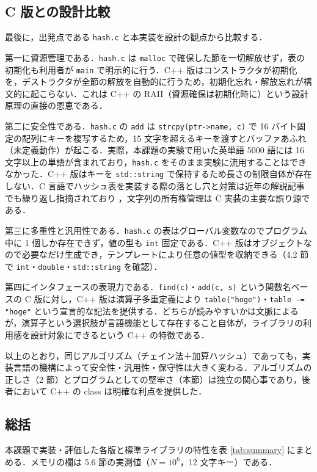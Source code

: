 \subsection{C 版との設計比較}

最後に，出発点である {\tt hash.c} と本実装を設計の観点から比較する．

第一に資源管理である．{\tt hash.c} は {\tt malloc} で確保した節を一切解放せず，表の初期化も利用者が {\tt main} で明示的に行う．C++ 版はコンストラクタが初期化を，デストラクタが全節の解放を自動的に行うため，初期化忘れ・解放忘れが構文的に起こらない．これは C++ の RAII（資源確保は初期化時に）という設計原理の直接の恩恵である．

第二に安全性である．{\tt hash.c} の {\tt add} は {\tt strcpy(ptr->name, c)} で 16 バイト固定の配列にキーを複写するため，15 文字を超えるキーを渡すとバッファあふれ（未定義動作）が起こる．実際，本課題の実験で用いた英単語 5000 語には 16 文字以上の単語が含まれており，{\tt hash.c} をそのまま実験に流用することはできなかった．C++ 版はキーを {\tt std::string} で保持するため長さの制限自体が存在しない．C 言語でハッシュ表を実装する際の落とし穴と対策は近年の解説記事でも繰り返し指摘されており \cite{hoyt2021}，文字列の所有権管理は C 実装の主要な誤り源である．

第三に多重性と汎用性である．{\tt hash.c} の表はグローバル変数なのでプログラム中に 1 個しか存在できず，値の型も {\tt int} 固定である．C++ 版はオブジェクトなので必要なだけ生成でき，テンプレートにより任意の値型を収納できる（4.2 節で {\tt int}・{\tt double}・{\tt std::string} を確認）．

第四にインタフェースの表現力である．{\tt find(c)}・{\tt add(c, s)} という関数名ベースの C 版に対し，C++ 版は演算子多重定義により {\tt table("hoge")}・{\tt table -= "hoge"} という宣言的な記法を提供する．どちらが読みやすいかは文脈によるが，演算子という選択肢が言語機能として存在すること自体が，ライブラリの利用感を設計対象にできるという C++ の特徴である．

以上のとおり，同じアルゴリズム（チェイン法＋加算ハッシュ）であっても，実装言語の機構によって安全性・汎用性・保守性は大きく変わる．アルゴリズムの正しさ（2 節）とプログラムとしての堅牢さ（本節）は独立の関心事であり，後者において C++ の class は明確な利点を提供した．

\subsection{総括}

本課題で実装・評価した各版と標準ライブラリの特性を表 \ref{tab:summary} にまとめる．メモリの欄は 5.6 節の実測値（$N=10^6$，12 文字キー）である．

